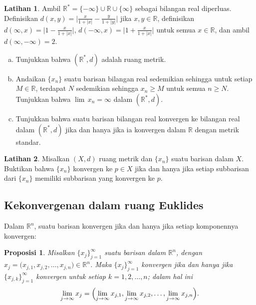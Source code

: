 \documentclass[12pt,openany]{book}
\newcommand{\sabs}[1]{\lvert {#1} \rvert}
\newcommand{\babs}[1]{\bigl\lvert {#1} \bigr\rvert}
\newcommand{\R}{{\mathbb{R}}}
\theoremstyle{plain}
\newtheorem{prop}[thm]{Proposisi}
\theoremstyle{remark}
\theoremstyle{definition}
\newenvironment{exbox}{%
    \def\FrameCommand{\vrule width 1pt \relax\hspace{10pt}}%
    \MakeFramed{\advance\hsize-\width\FrameRestore}%
}{%
    \endMakeFramed
}
\newenvironment{exparts}{%
    \leavevmode\begin{enumerate}[a),noitemsep,topsep=0pt,parsep=0pt,partopsep=0pt]
}{%
    \end{enumerate}
}
\theoremstyle{exercise}
\newtheorem{exercise}{Latihan}[section]
\theoremstyle{example}
\begin{document}
\begin{exbox}
\begin{exercise} \label{exercise:extendedrealsmetric}
Ambil $\R^* = \{ -\infty \} \cup \R \cup \{ \infty \}$ sebagai bilangan real diperluas.
Definisikan $d(x,y) = \babs{\frac{x}{1+\sabs{x}} - \frac{y}{1+\sabs{y}}}$
jika $x, y \in \R$,
definisikan $d(\infty,x) = \babs{1 - \frac{x}{1+\sabs{x}}}$,
$d(-\infty,x) = \babs{1 + \frac{x}{1+\sabs{x}}}$
untuk semua $x \in \R$, dan
ambil $d(\infty,-\infty) = 2$.
\begin{exparts}
\item
Tunjukkan bahwa $(\R^*,d)$ adalah ruang metrik.
\item
Andaikan $\{ x_n \}$ suatu barisan bilangan real sedemikian sehingga
untuk setiap $M \in \R$, terdapat $N$ sedemikian sehingga
$x_n \geq M$ untuk semua $n \geq N$. Tunjukkan bahwa $\lim\, x_n = \infty$ dalam
$(\R^*,d)$.
\item
Tunjukkan bahwa suatu barisan bilangan real konvergen ke bilangan real
dalam $(\R^*,d)$ jika dan
hanya jika ia konvergen dalam $\R$ dengan metrik standar.
\end{exparts}
\end{exercise}

\begin{exercise}
Misalkan $(X,d)$ ruang metrik dan $\{ x_n \}$ suatu barisan dalam $X$.
Buktikan bahwa $\{ x_n \}$ konvergen ke $p \in X$
jika dan hanya jika
setiap subbarisan dari $\{ x_n \}$ memiliki subbarisan yang
konvergen ke $p$.
\end{exercise}
\end{exbox}

\subsection{Kekonvergenan dalam ruang Euklides}

Dalam $\R^n$, suatu barisan konvergen jika dan hanya jika setiap
komponennya konvergen:

\begin{prop} \label{prop:msconveuc}
Misalkan $\{ x_j \}_{j=1}^\infty$ suatu barisan dalam $\R^n$,
dengan $x_j = \bigl(x_{j,1},x_{j,2},\ldots,x_{j,n}\bigr) \in \R^n$.
Maka $\{ x_j \}_{j=1}^\infty$ konvergen jika dan hanya jika
$\{ x_{j,k} \}_{j=1}^\infty$ konvergen untuk setiap $k=1,2,\ldots,n$; dalam hal ini
\begin{equation*}
\lim_{j\to\infty}
x_j =
\Bigl(
\lim_{j\to\infty} x_{j,1},
\lim_{j\to\infty} x_{j,2},
\ldots,
\lim_{j\to\infty} x_{j,n}
\Bigr) .
\end{equation*}
\end{prop}
\end{document}

